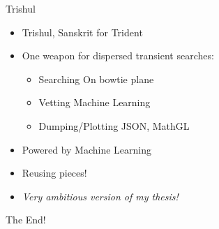 
\begin{frame}{Trishul}
\begin{itemize}
	\item Trishul, Sanskrit for Trident
	\item One weapon for dispersed transient searches:
		\begin{itemize}
			\item Searching \hfill On bowtie plane
			\item Vetting   \hfill Machine Learning
			\item Dumping/Plotting \hfill JSON, MathGL
		\end{itemize}
	\item Powered by Machine Learning
	\item Reusing pieces!
	\item \emph{Very ambitious version of my thesis!}
\end{itemize}
{\Huge The End!}
\end{frame}
